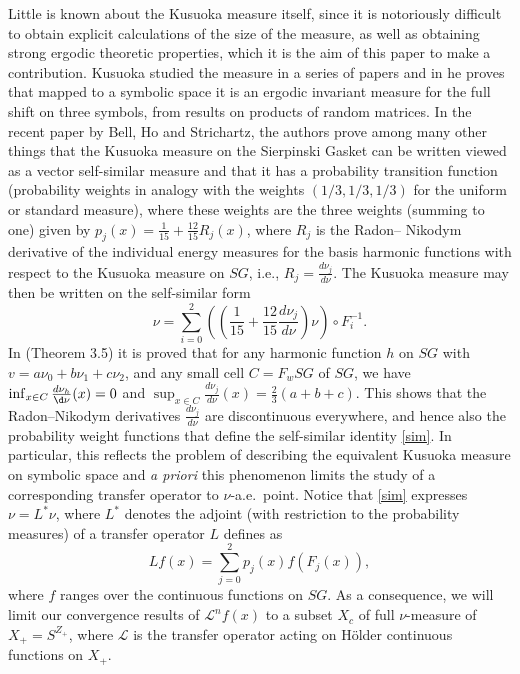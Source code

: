\documentclass[11pt]{scrartcl}
\theoremstyle{plain} %
\theoremstyle{definition}
\begin{document}
Little is known about the Kusuoka measure itself, since it is notoriously difficult to obtain explicit calculations of the size of the measure, as well as obtaining strong ergodic theoretic properties, which it is the aim of this paper to make a contribution. Kusuoka studied the measure in a series of papers and in \cite{kusuoka2} he proves that mapped to a symbolic space it is an ergodic invariant measure for the full shift on three symbols, from results on products of random matrices. In the recent paper by Bell, Ho and Strichartz\cite{str3}, the authors prove among many other things that the Kusuoka measure on the Sierpinski Gasket can be written viewed as a vector self-similar measure and that it has a probability transition function (probability weights in analogy with the weights $(1/3, 1/3, 1/3)$ for the uniform or standard measure), where these weights are the three weights (summing to one) given by $p_j(x)=\frac{1}{15}+\frac{12}{15}R_j(x)$, where $R_j$ is the Radon--
 Nikodym derivative of the individual energy measures for the basis harmonic functions with respect to the Kusuoka measure on $SG$, i.e., $R_j=\frac{d\nu_j}{d\nu}$. The Kusuoka measure may then be written on the self-similar form
\begin{equation}\label{sim}
\nu=\sum_{i=0}^2 \left(\left(\frac{1}{15}+\frac{12}{15}\frac{d\nu_j}{d\nu}\right)\nu \right) \circ F_i^{-1}.
\end{equation}
In \cite{str} (Theorem 3.5) it is proved that for any harmonic function $h$ on $SG$ with $v=a\nu_0+b\nu_1+c\nu_2$, and any small cell $C=F_{w}SG$ of $SG$, we have $\inf_{x\in C}\frac{d\nu_h}{\d\nu}(x)=0$ and $\sup_{x\in C}\frac{d\nu_j}{d\nu}(x)=\frac{2}{3}(a+b+c)$. This shows that the Radon--Nikodym derivatives $\frac{d\nu_j}{d\nu}$ are discontinuous everywhere, and hence also the probability weight functions that define the self-similar identity \eqref{sim}. In particular, this reflects the problem of describing the equivalent Kusuoka measure on symbolic space and {\em a priori} this phenomenon limits the study of a corresponding transfer operator to $\nu$-a.e.\ point. Notice that \eqref{sim} expresses $\nu=L^* \nu$, where $L^*$ denotes the adjoint (with restriction to the probability measures) of a transfer operator $L$ defines as 
$$Lf(x)=\sum_{j=0}^2 p_j(x) f(F_j (x)),$$
where $f$ ranges over the continuous functions on $SG$. As a consequence, we will limit our convergence results of ${\mathcal L}^n f(x)$ to a subset $X_c$ of full $\nu$-measure  of $X_+=S^{Z_+}$, where ${\mathcal L}$ is the transfer operator acting on H\"older continuous functions on $X_+$.
\end{document}
